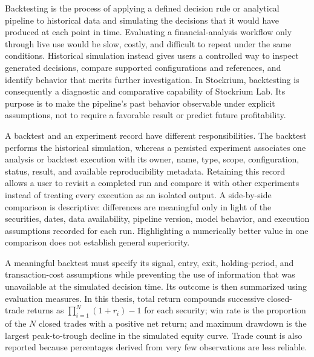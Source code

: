 Backtesting is the process of applying a defined decision rule or analytical pipeline to historical data and simulating the decisions that it would have produced at each point in time. Evaluating a financial-analysis workflow only through live use would be slow, costly, and difficult to repeat under the same conditions. Historical simulation instead gives users a controlled way to inspect generated decisions, compare supported configurations and references, and identify behavior that merits further investigation. In Stockrium, backtesting is consequently a diagnostic and comparative capability of Stockrium Lab. Its purpose is to make the pipeline's past behavior observable under explicit assumptions, not to require a favorable result or predict future profitability.

A backtest and an experiment record have different responsibilities. The backtest performs the historical simulation, whereas a persisted experiment associates one analysis or backtest execution with its owner, name, type, scope, configuration, status, result, and available reproducibility metadata. Retaining this record allows a user to revisit a completed run and compare it with other experiments instead of treating every execution as an isolated output. A side-by-side comparison is descriptive: differences are meaningful only in light of the securities, dates, data availability, pipeline version, model behavior, and execution assumptions recorded for each run. Highlighting a numerically better value in one comparison does not establish general superiority.

A meaningful backtest must specify its signal, entry, exit, holding-period, and transaction-cost assumptions while preventing the use of information that was unavailable at the simulated decision time. Its outcome is then summarized using evaluation measures. In this thesis, total return compounds successive closed-trade returns as $\prod_{i=1}^{N}(1+r_i)-1$ for each security; win rate is the proportion of the $N$ closed trades with a positive net return; and maximum drawdown is the largest peak-to-trough decline in the simulated equity curve. Trade count is also reported because percentages derived from very few observations are less reliable.

